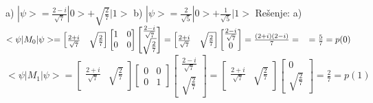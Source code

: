 \documentclass{article}
\begin{document}
a) $|\psi> = \frac{2-i}{\sqrt{7}}|0> + \sqrt{\frac{2}{7}}|1>$
\vspace{0.1cm}\newline
b) $|\psi> = \frac{2}{\sqrt{5}}|0> + \frac{1}{\sqrt{5}}|1>$
\vspace*{0.4cm}\newline
Rešenje: \vspace{0.2cm}\newline
a) $<\psi|M_0|\psi> = \begin{bmatrix}
    \frac{2+i}{\sqrt{7}} & \sqrt{\frac{2}{7}}
\end{bmatrix}\begin{bmatrix}
    1 & 0\\
    0 & 0
\end{bmatrix}\begin{bmatrix}
    \frac{2-i}{\sqrt{7}}\\
    \sqrt{\frac{2}{7}}
\end{bmatrix} = \begin{bmatrix}
    \frac{2+i}{\sqrt{7}} & \sqrt{\frac{2}{7}}
\end{bmatrix}\begin{bmatrix}
    \frac{2-i}{\sqrt{7}}\\
    0
\end{bmatrix} = \frac{(2+i)(2-i)}{7}= \hspace*{0.4cm}= \frac{5}{7} = p(0)$
\vspace{0.1cm}\newline
\hspace*{0.4cm}$<\psi|M_1|\psi> = \begin{bmatrix}
    \frac{2+i}{\sqrt{7}} & \sqrt{\frac{2}{7}}
\end{bmatrix}\begin{bmatrix}
    0 & 0\\
    0 & 1
\end{bmatrix}\begin{bmatrix}
    \frac{2-i}{\sqrt{7}}\\
    \sqrt{\frac{2}{7}}
\end{bmatrix} = \begin{bmatrix}
    \frac{2+i}{\sqrt{7}} & \sqrt{\frac{2}{7}}
\end{bmatrix}\begin{bmatrix}
    0\\
    \sqrt{\frac{2}{7}}
\end{bmatrix} = \frac{2}{7} = p(1)$
\vspace{0.1cm}\newline
\end{document}
